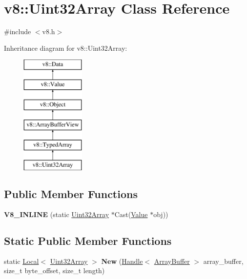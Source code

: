 \hypertarget{classv8_1_1_uint32_array}{}\section{v8\+:\+:Uint32\+Array Class Reference}
\label{classv8_1_1_uint32_array}


{\ttfamily \#include $<$v8.\+h$>$}

Inheritance diagram for v8\+:\+:Uint32\+Array\+:\begin{figure}[H]
\begin{center}
\leavevmode
\includegraphics[height=6.000000cm]{classv8_1_1_uint32_array}
\end{center}
\end{figure}
\subsection*{Public Member Functions}
\begin{DoxyCompactItemize}
\item 
\hypertarget{classv8_1_1_uint32_array_a6d6331a068bd0d5ee818201f232426d7}{}{\bfseries V8\+\_\+\+I\+N\+L\+I\+N\+E} (static \hyperlink{classv8_1_1_uint32_array}{Uint32\+Array} $\ast$Cast(\hyperlink{classv8_1_1_value}{Value} $\ast$obj))\label{classv8_1_1_uint32_array_a6d6331a068bd0d5ee818201f232426d7}

\end{DoxyCompactItemize}
\subsection*{Static Public Member Functions}
\begin{DoxyCompactItemize}
\item 
\hypertarget{classv8_1_1_uint32_array_a38de3d179f9a569a91ee9aef4d9f923f}{}static \hyperlink{classv8_1_1_local}{Local}$<$ \hyperlink{classv8_1_1_uint32_array}{Uint32\+Array} $>$ {\bfseries New} (\hyperlink{classv8_1_1_handle}{Handle}$<$ \hyperlink{classv8_1_1_array_buffer}{Array\+Buffer} $>$ array\+\_\+buffer, size\+\_\+t byte\+\_\+offset, size\+\_\+t length)\label{classv8_1_1_uint32_array_a38de3d179f9a569a91ee9aef4d9f923f}

\end{DoxyCompactItemize}
